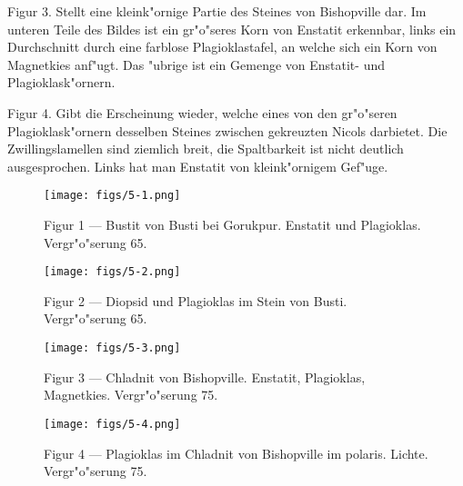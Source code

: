 \documentclass[a4paper, 11pt, oneside, polutonikogreek, german]{article}
\begin{document}
Figur 3. Stellt eine kleink"ornige Partie des Steines von Bishopville dar. Im unteren Teile des Bildes ist ein gr"o"seres Korn von Enstatit erkennbar, links ein Durchschnitt durch eine farblose Plagioklastafel, an welche sich ein Korn von Magnetkies anf"ugt. Das "ubrige ist ein Gemenge von Enstatit- und Plagioklask"ornern.

Figur 4. Gibt die Erscheinung wieder, welche eines von den gr"o"seren Plagioklask"ornern desselben Steines zwischen gekreuzten Nicols darbietet. Die Zwillingslamellen sind ziemlich breit, die Spaltbarkeit ist nicht deutlich ausgesprochen. Links hat man Enstatit von kleink"ornigem Gef"uge.
\clearpage

\vspace*{\fill}
\begin{figure}[H]
\centering
\texttt{[image: figs/5-1.png]}
\caption{\small Figur 1 --- Bustit von Busti bei Gorukpur. Enstatit und Plagioklas. Vergr"o"serung 65.}
\end{figure}
\vspace*{\fill}
\clearpage

\vspace*{\fill}
\begin{figure}[H]
\centering
\texttt{[image: figs/5-2.png]}
\caption{\small Figur 2 --- Diopsid und Plagioklas im Stein von Busti. Vergr"o"serung 65.}
\end{figure}
\vspace*{\fill}
\clearpage

\vspace*{\fill}
\begin{figure}[H]
\centering
\texttt{[image: figs/5-3.png]}
\caption{\small Figur 3 --- Chladnit von Bishopville. Enstatit, Plagioklas, Magnetkies. Vergr"o"serung 75.}
\end{figure}
\vspace*{\fill}
\clearpage

\vspace*{\fill}
\begin{figure}[H]
\centering
\texttt{[image: figs/5-4.png]}
\caption{\small Figur 4 --- Plagioklas im Chladnit von Bishopville im polaris. Lichte. Vergr"o"serung 75.}
\end{figure}
\vspace*{\fill}
\clearpage

\end{document}
